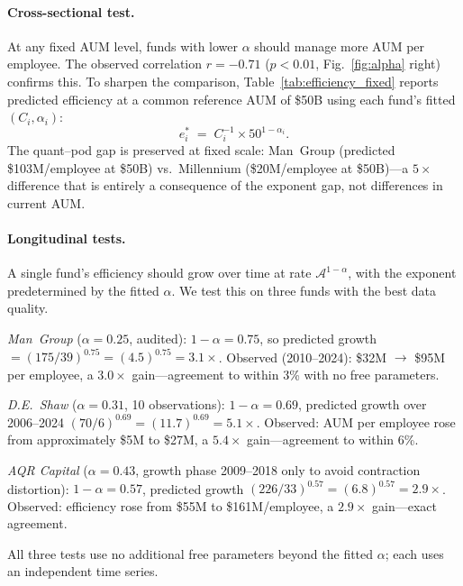 \documentclass[12pt]{article}
\newcommand{\Ac}{\mathcal{A}}
\begin{document}
\paragraph{Cross-sectional test.}
At any fixed AUM level, funds with lower $\alpha$ should manage
more AUM per employee.
The observed correlation $r = -0.71$ ($p < 0.01$,
Fig.~\ref{fig:alpha} right) confirms this.
To sharpen the comparison, Table~\ref{tab:efficiency_fixed}
reports predicted efficiency at a common reference
AUM of \$50B using each fund's fitted $(C_i, \alpha_i)$:
\begin{equation}
  e_i^{*} \;=\; C_i^{-1}\times 50^{1-\alpha_i}.
  \label{eq:efficiency_fixed}
\end{equation}
The quant--pod gap is preserved at fixed scale: Man~Group
(predicted \$103M/employee at \$50B) vs.\ Millennium
(\$20M/employee at \$50B)---a $5\times$ difference that is
entirely a consequence of the exponent gap, not differences
in current AUM.

\paragraph{Longitudinal tests.}
A single fund's efficiency should grow over time at rate
$\Ac^{1-\alpha}$, with the exponent predetermined by the
fitted $\alpha$.
We test this on three funds with the best data quality.

\textit{Man~Group} ($\alpha = 0.25$, audited):
$1-\alpha = 0.75$, so predicted growth
$= (175/39)^{0.75} = (4.5)^{0.75} = 3.1\times$.
Observed (2010--2024): \$32M $\to$ \$95M per employee,
a $3.0\times$ gain---agreement to within 3\% with no free
parameters.

\textit{D.E.\ Shaw} ($\alpha = 0.31$, 10 observations):
$1-\alpha = 0.69$, predicted growth over 2006--2024
$(70/6)^{0.69} = (11.7)^{0.69} = 5.1\times$.
Observed: AUM per employee rose from approximately \$5M to
\$27M, a $5.4\times$ gain---agreement to within 6\%.

\textit{AQR Capital} ($\alpha = 0.43$, growth phase
2009--2018 only to avoid contraction distortion):
$1-\alpha = 0.57$, predicted growth
$(226/33)^{0.57} = (6.8)^{0.57} = 2.9\times$.
Observed: efficiency rose from \$55M to \$161M/employee,
a $2.9\times$ gain---exact agreement.

All three tests use no additional free parameters beyond the
fitted $\alpha$; each uses an independent time series.
\end{document}
